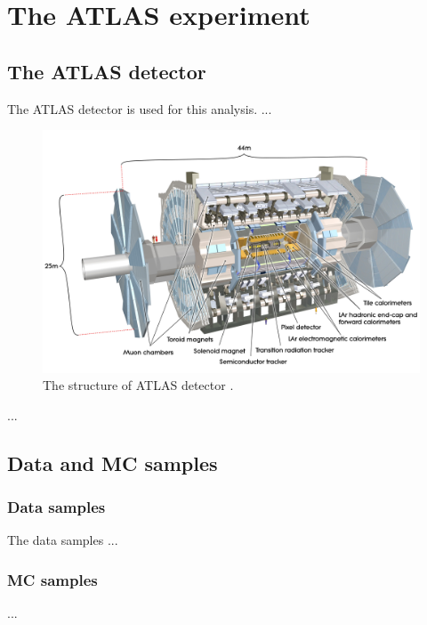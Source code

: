 \chapter{The ATLAS experiment}

\section{The ATLAS detector}

The ATLAS detector \cite{ATLAS:2014aga, Detector} is used for this analysis. ...

\begin{figure}
	\centering
	\includegraphics[width=0.8\linewidth]{Figures/ATLAS_detector}
	\caption{The structure of ATLAS detector \cite{Detector}.}
	\label{fig:ATLAS_detector}
\end{figure}
...


\section{Data and MC samples}

\subsection{Data samples}\label{subsec:data_trigger}
The data samples ...

\subsection{MC samples}\label{MCsamples}

...


